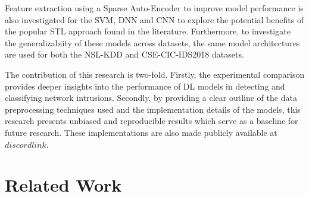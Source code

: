 \documentclass[conference]{IEEEtran}
\begin{document}
Feature extraction using a Sparse Auto-Encoder to improve model performance is also investigated for the SVM, DNN and CNN to explore the potential benefits of the popular STL approach found in the literature. Furthermore, to investigate the generalizabiity of these models across datasets, the same model architectures are used for both the NSL-KDD and CSE-CIC-IDS2018 datasets. 

The contribution of this research is two-fold. Firstly, the experimental comparison provides deeper insights into the performance of DL models in detecting and classifying network intrusions. Secondly, by providing a clear outline of the data preprocessing techniques used and the implementation details of the models, this research presents unbiased and reproducible results which serve as a baseline for future research. These implementations are also made publicly available at $discord link$. 


\section{Related Work}


\end{document}
